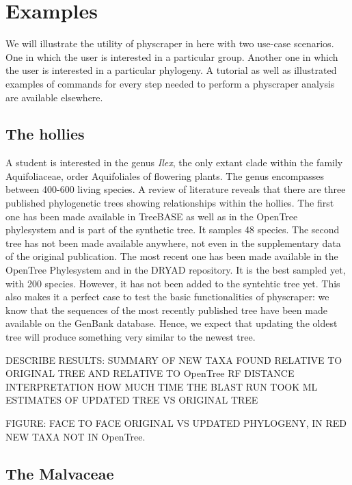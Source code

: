 \documentclass[]{article}
\begin{document}
\hypertarget{examples}{%
\section{Examples}\label{examples}}

We will illustrate the utility of physcraper in here with two use-case scenarios. One in which the user is interested in a particular group. Another one in which the user is interested in a particular phylogeny.
A tutorial as well as illustrated examples of commands for every step needed to perform a physcraper analysis are available elsewhere.

\hypertarget{the-hollies}{%
\subsection{The hollies}\label{the-hollies}}

A student is interested in the genus \emph{Ilex}, the only extant clade within the family Aquifoliaceae, order Aquifoliales of flowering plants.
The genus encompasses between 400-600 living species. A review of literature reveals that there are three published phylogenetic trees showing relationships within the hollies.
The first one has been made available in TreeBASE as well as in the OpenTree phylesystem and is part of the synthetic tree. It samples 48 species.
The second tree has not been made available anywhere, not even in the supplementary data of the original publication.
The most recent one has been made available in the OpenTree Phylesystem and in the DRYAD repository. It is the best sampled yet, with 200 species. However, it has not been added to the syntehtic tree yet.
This also makes it a perfect case to test the basic functionalities of physcraper: we know that the sequences of the most recently published tree have been made available on the GenBank database. Hence, we expect that updating the oldest tree will produce something very similar to the newest tree.

DESCRIBE RESULTS: SUMMARY OF NEW TAXA FOUND RELATIVE TO ORIGINAL TREE AND RELATIVE TO OpenTree
RF DISTANCE INTERPRETATION
HOW MUCH TIME THE BLAST RUN TOOK
ML ESTIMATES OF UPDATED TREE VS ORIGINAL TREE

FIGURE: FACE TO FACE ORIGINAL VS UPDATED PHYLOGENY, IN RED NEW TAXA NOT IN OpenTree.

\hypertarget{the-malvaceae}{%
\subsection{The Malvaceae}\label{the-malvaceae}}
\end{document}
